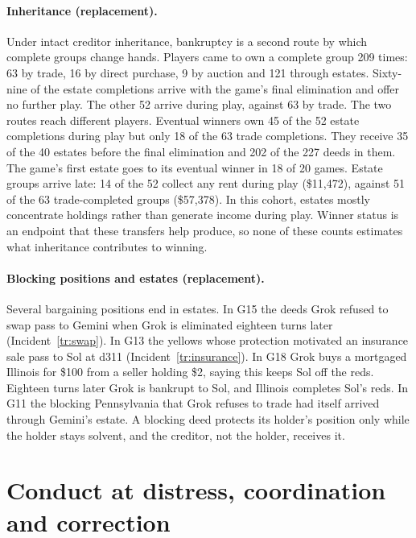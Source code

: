 
\paragraph{Inheritance (replacement).} Under intact creditor inheritance, bankruptcy is a second route by which complete groups change hands. Players came to own a complete group 209 times: 63 by trade, 16 by direct purchase, 9 by auction and 121 through estates. Sixty-nine of the estate completions arrive with the game's final elimination and offer no further play. The other 52 arrive during play, against 63 by trade. The two routes reach different players. Eventual winners own 45 of the 52 estate completions during play but only 18 of the 63 trade completions. They receive 35 of the 40 estates before the final elimination and 202 of the 227 deeds in them. The game's first estate goes to its eventual winner in 18 of 20 games. Estate groups arrive late: 14 of the 52 collect any rent during play (\$11,472), against 51 of the 63 trade-completed groups (\$57,378). In this cohort, estates mostly concentrate holdings rather than generate income during play. Winner status is an endpoint that these transfers help produce, so none of these counts estimates what inheritance contributes to winning.

\paragraph{Blocking positions and estates (replacement).} Several bargaining positions end in estates. In G15 the deeds Grok refused to swap pass to Gemini when Grok is eliminated eighteen turns later (Incident~\ref{tr:swap}). In G13 the yellows whose protection motivated an insurance sale pass to Sol at d311 (Incident~\ref{tr:insurance}). In G18 Grok buys a mortgaged Illinois for \$100 from a seller holding \$2, saying this keeps Sol off the reds. Eighteen turns later Grok is bankrupt to Sol, and Illinois completes Sol's reds. In G11 the blocking Pennsylvania that Grok refuses to trade had itself arrived through Gemini's estate. A blocking deed protects its holder's position only while the holder stays solvent, and the creditor, not the holder, receives it.

\section{Conduct at distress, coordination and correction}\label{sec:conduct}

